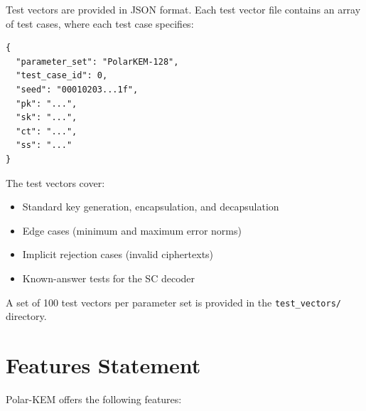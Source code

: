 \documentclass[11pt,a4paper]{article}
\newcommand{\polarKem}{\textsf{Polar-KEM}\xspace}
\begin{document}
Test vectors are provided in JSON format. Each test vector file contains an array of test cases, where each test case specifies:

\begin{verbatim}
{
  "parameter_set": "PolarKEM-128",
  "test_case_id": 0,
  "seed": "00010203...1f",
  "pk": "...",
  "sk": "...",
  "ct": "...",
  "ss": "..."
}
\end{verbatim}

The test vectors cover:
\begin{itemize}[leftmargin=2em]
\item Standard key generation, encapsulation, and decapsulation
\item Edge cases (minimum and maximum error norms)
\item Implicit rejection cases (invalid ciphertexts)
\item Known-answer tests for the SC decoder
\end{itemize}

A set of 100 test vectors per parameter set is provided in the \texttt{test\_vectors/} directory.

\section{Features Statement}\label{sec:features}

\polarKem offers the following features:
\end{document}
